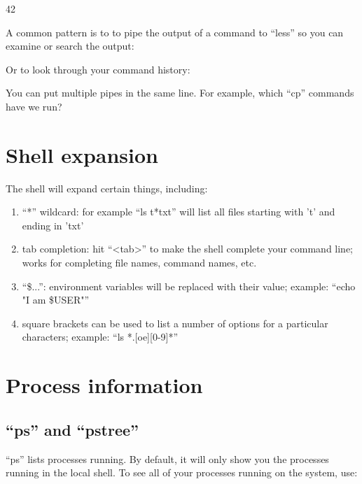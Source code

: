 \begin{prompt}
     42
\end{prompt}

A common pattern is to to pipe the output of a command to ``less'' so you can
examine or search the output:

\begin{prompt}
\end{prompt}

Or to look through your command history:

\begin{prompt}
\end{prompt}

You can put multiple pipes in the same line. For example, which ``cp'' commands have we run?

\begin{prompt}
\end{prompt}

\section{Shell expansion}

The shell will expand certain things, including:

\begin{enumerate}
\item ``*'' wildcard: for example ``ls t*txt'' will list all files starting with 't' and ending in 'txt'
\item tab completion: hit ``<tab>'' to make the shell complete your command line; works for completing file names, command names, etc.
\item ``\${...}'': environment variables will be replaced with their value;
example: ``echo "I am \$USER"''
\item square brackets can be used to list a number of options for a particular characters; example: ``ls *.[oe][0-9]*''
\end{enumerate}

\section{Process information}

\subsection{``ps'' and ``pstree''}
``ps'' lists processes running. By default, it will only show you the processes
running in the local shell. To see all of your processes running on the system,
use:

